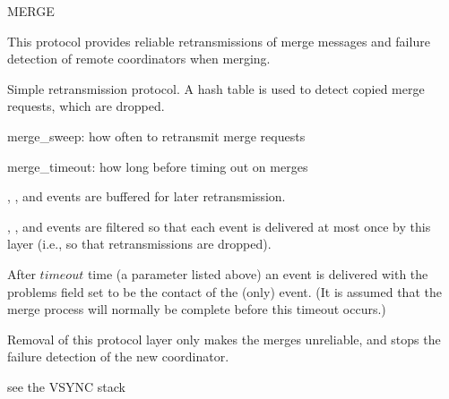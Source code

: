 %
%
%
\begin{Layer}{MERGE}

This protocol provides reliable retransmissions of merge messages and failure
detection of remote coordinators when merging.

\begin{Protocol}
Simple retransmission protocol.  A hash table is used to detect copied
merge requests, which are dropped.
\end{Protocol}

\begin{Parameters}
\item
merge\_sweep: how often to retransmit merge requests
\item
merge\_timeout: how long before timing out on merges
\end{Parameters}

\begin{Properties}
\item
{}, , and  events are
buffered for later retransmission.
\item
{}, , and  events are filtered
so that each event is delivered at most once by this layer (i.e., so that
retransmissions are dropped).
\item
After $timeout$ time (a parameter listed above) an  event is
delivered with the problems field set to be the contact of the 
(only) event.  (It is assumed that the merge process will normally be
complete before this timeout occurs.)
\end{Properties}

\begin{Notes}
\item
Removal of this protocol layer only makes the merges unreliable, and
stops the failure detection of the new coordinator.
\end{Notes}

\begin{Sources}
\end{Sources}

\begin{GenEvent}
\end{GenEvent}

\begin{Testing}
\item see the VSYNC stack
\end{Testing}
\end{Layer}

